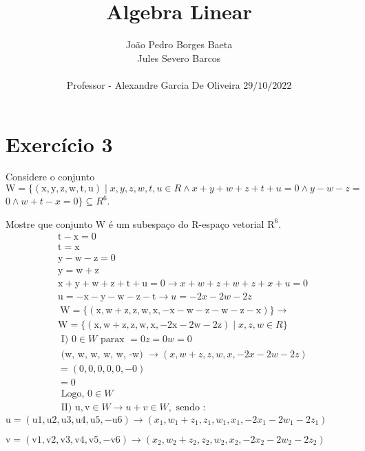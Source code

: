 \documentclass[10pt]{article}
\title{Algebra Linear }
\author{João Pedro Borges Baeta\\
Jules Severo Barcos\\\\Professor - Alexandre Garcia De Oliveira
$29 / 10 / 2022$}
\date{}
\begin{document}
\maketitle
\section{Exercício 3}
Considere o conjunto $\mathrm{W}=\{(\mathrm{x}, \mathrm{y}, \mathrm{z}, \mathrm{w}, \mathrm{t}, \mathrm{u}) \mid x, y, z, w, t, u \in R \wedge x+y+w+z+t+u=0 \wedge y-w-z=$ $0 \wedge w+t-x=0\} \subseteq R^{6}$.

Mostre que conjunto $\mathrm{W}$ é um subespaço do R-espaço vetorial $\mathrm{R}^{6}$.
$$
\begin{aligned}
&\mathrm{t}-\mathrm{x}=0 \\
&\mathrm{t}=\mathrm{x} \\
&\mathrm{y}-\mathrm{w}-\mathrm{z}=0 \\
&\mathrm{y}=\mathrm{w}+\mathrm{z} \\
&\mathrm{x}+\mathrm{y}+\mathrm{w}+\mathrm{z}+\mathrm{t}+\mathrm{u}=0 \rightarrow x+w+z+w+z+x+u=0 \\
&\mathrm{u}=-\mathrm{x}-\mathrm{y}-\mathrm{w}-\mathrm{z}-\mathrm{t} \rightarrow u=-2 x-2 w-2 z \\
&\mathrm{~W}=\{(\mathrm{x}, \mathrm{w}+\mathrm{z}, \mathrm{z}, \mathrm{w}, \mathrm{x},-\mathrm{x}-\mathrm{w}-\mathrm{z}-\mathrm{w}-\mathrm{z}-\mathrm{x})\} \rightarrow \\
&\mathrm{W}=\{(\mathrm{x}, \mathrm{w}+\mathrm{z}, \mathrm{z}, \mathrm{w}, \mathrm{x},-2 \mathrm{x}-2 \mathrm{w}-2 \mathrm{z}) \mid x, z, w \in R\} \\
&\text { I) } 0 \in W \text { parax }=0 z=0 w=0 \\
&\text { (w, w, w, w, w, -w) } \rightarrow(x, w+z, z, w, x,-2 x-2 w-2 z) \\
&=(0,0,0,0,0,-0) \\
&=0 \\
&\text { Logo, } 0 \in W \\
&\text { II) } \mathrm{u}, \mathrm{v} \in W \rightarrow u+v \in W, \text { sendo : }
\end{aligned}
$$
$\mathrm{u}=(\mathrm{u} 1, \mathrm{u} 2, \mathrm{u} 3, \mathrm{u} 4, \mathrm{u} 5,-\mathrm{u} 6) \rightarrow\left(x_{1}, w_{1}+z_{1}, z_{1}, w_{1}, x_{1},-2 x_{1}-2 w_{1}-2 z_{1}\right)$

$\mathrm{v}=(\mathrm{v} 1, \mathrm{v} 2, \mathrm{v} 3, \mathrm{v} 4, \mathrm{v} 5,-\mathrm{v} 6) \rightarrow\left(x_{2}, w_{2}+z_{2}, z_{2}, w_{2}, x_{2},-2 x_{2}-2 w_{2}-2 z_{2}\right)$
\end{document}
